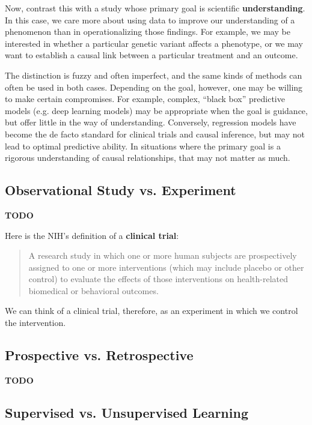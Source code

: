 Now, contrast this with a study whose primary goal is scientific \textbf{understanding}. In this case, we care more about using data to improve our understanding of a phenomenon than in operationalizing those findings. For example, we may be interested in whether a particular genetic variant affects a phenotype, or we may want to establish a causal link between a particular treatment and an outcome. 

The distinction is fuzzy and often imperfect, and the same kinds of methods can often be used in both cases. Depending on the goal, however, one may be willing to make certain compromises. For example, complex, ``black box'' predictive models (e.g. deep learning models) may be appropriate when the goal is guidance, but offer little in the way of understanding. Conversely, regression models have become the de facto standard for clinical trials and causal inference, but may not lead to optimal predictive ability. In situations where the primary goal is a rigorous understanding of causal relationships, that may not matter as much.

\subsection{Observational Study vs. Experiment}

\textbf{TODO}

Here is the NIH's definition of a \textbf{clinical trial}:
\begin{quote}
A research study in which one or more human subjects are prospectively assigned to one or more interventions (which may include placebo or other control) to evaluate the effects of those interventions on health-related biomedical or behavioral outcomes.
\end{quote}
We can think of a clinical trial, therefore, as an experiment in which we control the intervention. 

\subsection{Prospective vs. Retrospective}

\textbf{TODO}

\subsection{Supervised vs. Unsupervised Learning}


